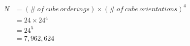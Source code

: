 \documentclass[preview, border=2mm]{standalone}
\begin{document}
\vspace*{\fill}

{\fontsize{32pt}{40pt}\selectfont
	\begin{align*}
	N
		&= (\#\ of\ cube\ orderings) \times (\#\ of\ cube\ orientations)^4 \\
		&= 24 \times 24^4 \\
		&= 24^5 \\
		&= 7{,}962{,}624
	\end{align*}
}

\vspace*{\fill}
\end{document}
